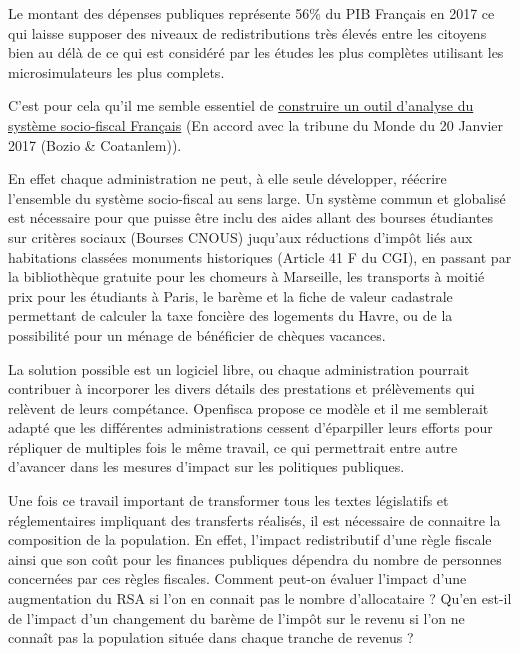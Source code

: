 Le montant des dépenses publiques représente 56\% du PIB Français en
2017 ce qui laisse supposer des niveaux de redistributions très élevés
entre les citoyens bien au délà de ce qui est considéré par les études
les plus complètes utilisant les microsimulateurs les plus complets.

C'est pour cela qu'il me semble essentiel de
\href{https://www.lemonde.fr/idees/article/2017/01/20/il-est-urgent-de-creer-de-meilleurs-outils-d-analyse-du-systeme-socio-fiscal-francais_5066250_3232.html?xtmc=\&xtcr=3}{construire
un outil d'analyse du système socio-fiscal Français} (En accord avec la
tribune du Monde du 20 Janvier 2017 (Bozio \& Coatanlem)).

En effet chaque administration ne peut, à elle seule développer,
réécrire l'ensemble du système socio-fiscal au sens large. Un système
commun et globalisé est nécessaire pour que puisse être inclu des aides
allant des bourses étudiantes sur critères sociaux (Bourses CNOUS)
juqu'aux réductions d'impôt liés aux habitations classées monuments
historiques (Article 41 F du CGI), en passant par la bibliothèque
gratuite pour les chomeurs à Marseille, les transports à moitié prix
pour les étudiants à Paris, le barème et la fiche de valeur cadastrale
permettant de calculer la taxe foncière des logements du Havre, ou de la
possibilité pour un ménage de bénéficier de chèques vacances.

La solution possible est un logiciel libre, ou chaque administration
pourrait contribuer à incorporer les divers détails des prestations et
prélèvements qui relèvent de leurs compétance. Openfisca propose ce
modèle et il me semblerait adapté que les différentes administrations
cessent d'éparpiller leurs efforts pour répliquer de multiples fois le
même travail, ce qui permettrait entre autre d'avancer dans les mesures
d'impact sur les politiques publiques.

Une fois ce travail important de transformer tous les textes législatifs
et réglementaires impliquant des transferts réalisés, il est nécessaire
de connaitre la composition de la population. En effet, l'impact
redistributif d'une règle fiscale ainsi que son coût pour les finances
publiques dépendra du nombre de personnes concernées par ces règles
fiscales. Comment peut-on évaluer l'impact d'une augmentation du RSA si
l'on en connait pas le nombre d'allocataire ? Qu'en est-il de l'impact
d'un changement du barème de l'impôt sur le revenu si l'on ne connaît
pas la population située dans chaque tranche de revenus ?


